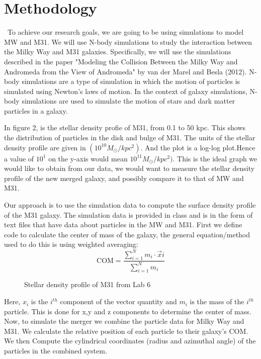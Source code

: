 \documentclass[preprint2, times]{aastex631}
\begin{document}
\section{Methodology}\label{sec:style}\
To achieve our research goals, we are going to be using simulations to model MW and M31. We will use N-body simulations to study the interaction between the Milky Way and M31 galaxies. Specifically, we will use the simulations described in the paper "Modeling the Collision Between the Milky Way and Andromeda from the View of Andromeda" by van der Marel and Besla (2012). N-body simulations are a type of simulation in which the motion of particles is simulated using Newton's laws of motion. In the context of galaxy simulations, N-body simulations are used to simulate the motion of stars and dark matter particles in a galaxy.
\par
In figure 2, is the stellar density profie of M31, from 0.1 to 50 kpc. This shows the distribution of particles in the disk and bulge of M31. The units of the stellar density profile are given in $(10^{10}M_\odot / kpc^2)$. And the plot is a log-log plot.Hence a value of $10^1$ on the y-axis would mean $10^{11}M_\odot / kpc^2)$. This is the ideal graph we would like to obtain from our data, we would want to measure the stellar density profile of the new merged galaxy, and possibly compare it to that of MW and M31.
\par
Our approach is to use the simulation data to compute the surface density profile of the M31 galaxy. The simulation data is provided in class and is in the form of text files that have data about particles in the MW and M31. First we define code to calculate the center of mass of the galaxy, the general equation/method used to do this is using weighted averaging:
\begin{equation}
\mathrm{COM} = \frac{\sum\limits_{i=1}^N m_i \cdot \vec{x}i}{\sum\limits_{i=1}^N m_i}
\end{equation}
\begin{figure}
    \centering
    \caption{Stellar density profile of M31 from Lab 6}
    \label{fig:galaxy}
\end{figure}
Here, $x_i$ is the $i^{th}$ component of the vector quantity and $m_i$ is the mass of the $i^{th}$ particle. This is done for x,y and z components to determine the center of mass. Now, to simulate the merger we combine the particle data for Milky Way and M31. We calculate the relative position of each particle to their galaxy's COM. We then Compute the cylindrical coordinates (radius and azimuthal angle) of the particles in the combined system.
\end{document}
